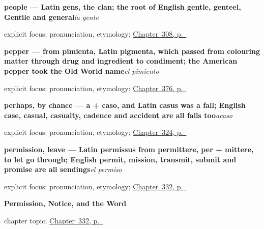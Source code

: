 \noindent\begin{minipage}[t]{\linewidth}
\raggedright
\textbf{people --- Latin gens, the clan; the root of English gentle, genteel, Gentile and general}\enspace\emph{la gente}\par
\footnotesize explicit focus: pronunciation, etymology; \hyperref[ch:ninos-y-gente]{Chapter~308, p.~\pageref*{ch:ninos-y-gente}}
\end{minipage}\par\smallskip

\noindent\begin{minipage}[t]{\linewidth}
\raggedright
\textbf{pepper — from pimienta, Latin pigmenta, which passed from colouring matter through drug and ingredient to condiment; the American pepper took the Old World name}\enspace\emph{el pimiento}\par
\footnotesize explicit focus: pronunciation, etymology; \hyperref[ch:la-harina-y-la-uva]{Chapter~376, p.~\pageref*{ch:la-harina-y-la-uva}}
\end{minipage}\par\smallskip

\noindent\begin{minipage}[t]{\linewidth}
\raggedright
\textbf{perhaps, by chance — a + caso, and Latin casus was a fall; English case, casual, casualty, cadence and accident are all falls too}\enspace\emph{acaso}\par
\footnotesize explicit focus: pronunciation, etymology; \hyperref[ch:verdad-y-siquiera]{Chapter~324, p.~\pageref*{ch:verdad-y-siquiera}}
\end{minipage}\par\smallskip

\noindent\begin{minipage}[t]{\linewidth}
\raggedright
\textbf{permission, leave — Latin permissus from permittere, per + mittere, to let go through; English permit, mission, transmit, submit and promise are all sendings}\enspace\emph{el permiso}\par
\footnotesize explicit focus: pronunciation, etymology; \hyperref[ch:permiso-y-voz]{Chapter~332, p.~\pageref*{ch:permiso-y-voz}}
\end{minipage}\par\smallskip

\noindent\begin{minipage}[t]{\linewidth}
\raggedright
\textbf{Permission, Notice, and the Word}\par
\footnotesize chapter topic; \hyperref[ch:permiso-y-voz]{Chapter~332, p.~\pageref*{ch:permiso-y-voz}}
\end{minipage}\par\smallskip

